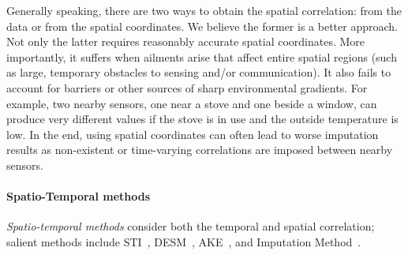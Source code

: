 Generally speaking, there are two ways to obtain the spatial correlation:
from the data or from the spatial coordinates.
We believe the former is a better approach. 
Not only the latter requires reasonably accurate spatial coordinates.
More importantly, it suffers when ailments arise that affect entire
spatial regions (such as large, temporary obstacles to sensing and/or communication).
It also fails to account for barriers or other
sources of sharp environmental gradients.
For example, two nearby sensors, one near a stove and one beside a window, can produce very different values if the stove is in use and the outside temperature is low.
In the end, using spatial coordinates can often lead to worse imputation results
as non-existent or time-varying correlations are imposed between nearby sensors.





\paragraph{Spatio-Temporal methods}
{\em Spatio-temporal methods} consider both the
temporal and spatial correlation; salient methods include
STI~\cite{Jian-Zhong:STI}, DESM~\cite{li2008data}, 
AKE~\cite{pan2010k}, and Imputation Method~\cite{Lim:robust}.

